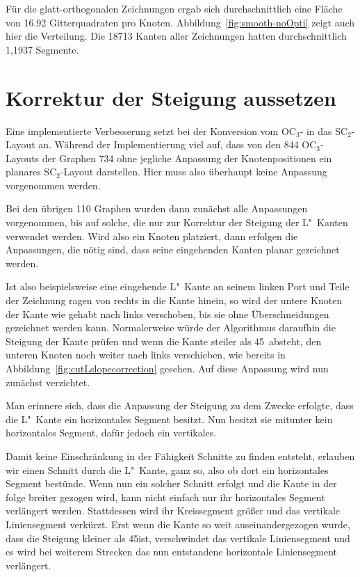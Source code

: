 \documentclass[a4paper]{scrreprt}
\theoremstyle{definition}
\begin{document}
Für die glatt-orthogonalen Zeichnungen ergab sich durchschnittlich eine Fläche von 16.92 Gitterquadraten pro Knoten. Abbildung~\ref{fig:smooth-noOpti} zeigt auch hier die Verteilung. Die 18713 Kanten aller Zeichnungen hatten durchschnittlich 1,1937 Segmente.


\section{Korrektur der Steigung aussetzen}

Eine implementierte Verbesserung setzt bei der Konversion vom OC$_3$- in das SC$_2$-Layout an. Während der Implementierung viel auf, dass von den 844 OC$_3$-Layouts der Graphen 734 ohne jegliche Anpassung der Knotenpositionen ein planares SC$_2$-Layout darstellen. Hier muss also überhaupt keine Anpassung vorgenommen werden.

Bei den übrigen 110 Graphen wurden dann zunächst alle Anpassungen vorgenommen, bis auf solche, die nur zur Korrektur der Steigung der L"~Kanten verwendet werden. Wird also ein Knoten platziert, dann erfolgen die Anpassungen, die nötig sind, dass seine eingehenden Kanten planar gezeichnet werden.

Ist also beispielsweise eine eingehende L"~Kante an seinem linken Port und Teile der Zeichnung ragen von rechts in die Kante hinein, so wird der untere Knoten der Kante wie gehabt nach links verschoben, bis sie ohne Überschneidungen gezeichnet werden kann. Normalerweise würde der Algorithmus daraufhin die Steigung der Kante prüfen und wenn die Kante steiler als 45\textdegree\ absteht, den unteren Knoten noch weiter nach links verschieben, wie bereits in Abbildung~\ref{fig:cutLslopecorrection} gesehen. Auf diese Anpassung wird nun zunächst verzichtet. 

Man erinnere sich, dass die Anpassung der Steigung zu dem Zwecke erfolgte, dass die L"~Kante ein horizontales Segment besitzt. Nun besitzt sie mitunter kein horizontales Segment, dafür jedoch ein vertikales.

Damit keine Einschränkung in der Fähigkeit Schnitte zu finden entsteht, erlauben wir einen Schnitt durch die L"~Kante, ganz so, also ob dort ein horizontales Segment bestünde. Wenn nun ein solcher Schnitt erfolgt und die Kante in der folge breiter gezogen wird, kann nicht einfach nur ihr horizontales Segment verlängert werden. Stattdessen wird ihr Kreissegment größer und das vertikale Liniensegment verkürzt. Erst wenn die Kante so weit auseinandergezogen wurde, dass die Steigung kleiner als 45\textdegree ist, verschwindet das vertikale Liniensegment und es wird bei weiterem Strecken das nun entstandene horizontale Liniensegment verlängert.
\end{document}
